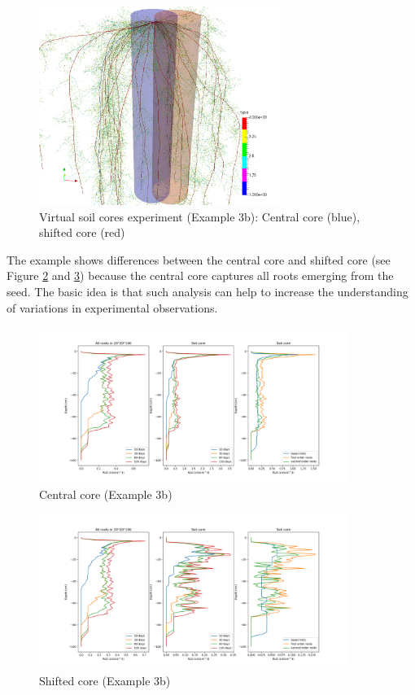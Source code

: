 \begin{figure}
\centering
\includegraphics[width=0.7\textwidth]{example_3d.png} %
\caption{Virtual soil cores experiment (Example 3b): Central core (blue), shifted core (red)} \label{fig:soilcoreGeom}
\end{figure} 


The example shows differences between the central core and shifted core (see Figure \ref{fig:central} and \ref{fig:shifted}) because the central core captures all roots emerging from the seed. The basic idea is that such analysis can help to increase the understanding of variations in experimental observations.

\begin{figure}
\centering
\includegraphics[width=0.9\textwidth]{example3b.png} 
\caption{Central core (Example 3b)} \label{fig:central}
\end{figure}

\begin{figure}
\centering
\includegraphics[width=0.9\textwidth]{example3b2.png} 
\caption{Shifted core (Example 3b)} \label{fig:shifted}
\end{figure}


